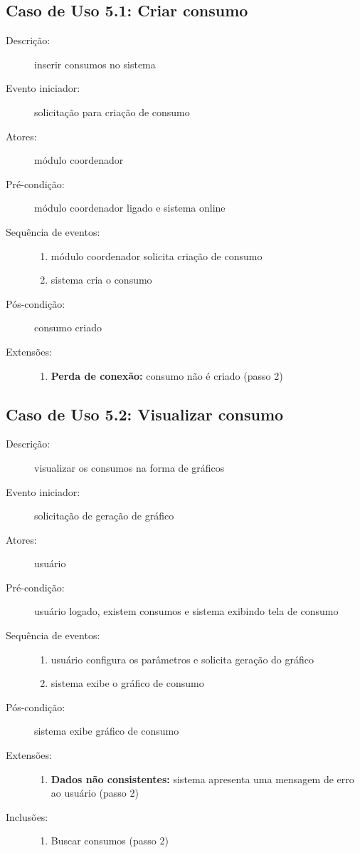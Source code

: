 \subsection{Caso de Uso 5.1: Criar consumo}
\begin{description}
	\item[Descrição:] inserir consumos no sistema
	\item[Evento iniciador:] solicitação para criação de consumo
	\item[Atores:] módulo coordenador
	\item[Pré-condição:] módulo coordenador ligado e sistema online
	\item[Sequência de eventos:] \hfill
		\begin{enumerate}
			\item{módulo coordenador solicita criação de consumo}
			\item{sistema cria o consumo}
		\end{enumerate}
	\item[Pós-condição:] consumo criado
	\item[Extensões:] \hfill
		\begin{enumerate}
			\item{\textbf{Perda de conexão:} consumo não é criado (passo 2)}
		\end{enumerate}
\end{description}
%
\subsection{Caso de Uso 5.2: Visualizar consumo}
\begin{description}
	\item[Descrição:] visualizar os consumos na forma de gráficos
	\item[Evento iniciador:] solicitação de geração de gráfico
	\item[Atores:] usuário
	\item[Pré-condição:] usuário logado, existem consumos e sistema exibindo tela de consumo
	\item[Sequência de eventos:] \hfill
		\begin{enumerate}
			\item{usuário configura os parâmetros e solicita geração do gráfico}
			\item{sistema exibe o gráfico de consumo}
		\end{enumerate}
	\item[Pós-condição:] sistema exibe gráfico de consumo
	\item[Extensões:] \hfill
		\begin{enumerate}
			\item{\textbf{Dados não consistentes:} sistema apresenta uma mensagem de erro ao usuário (passo 2)}
		\end{enumerate}
	\item[Inclusões:] \hfill
		\begin{enumerate}
			\item{Buscar consumos (passo 2)}
		\end{enumerate}
\end{description}
%
